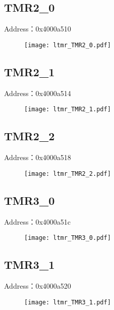 \subsection{TMR2\_0}
\label{ltmr-TMR2-0}
Address：0x4000a510
 \begin{figure}[H]
\texttt{[image: ltmr\_TMR2\_0.pdf]}
\end{figure}

\subsection{TMR2\_1}
\label{ltmr-TMR2-1}
Address：0x4000a514
 \begin{figure}[H]
\texttt{[image: ltmr\_TMR2\_1.pdf]}
\end{figure}

\subsection{TMR2\_2}
\label{ltmr-TMR2-2}
Address：0x4000a518
 \begin{figure}[H]
\texttt{[image: ltmr\_TMR2\_2.pdf]}
\end{figure}

\subsection{TMR3\_0}
\label{ltmr-TMR3-0}
Address：0x4000a51c
 \begin{figure}[H]
\texttt{[image: ltmr\_TMR3\_0.pdf]}
\end{figure}

\subsection{TMR3\_1}
\label{ltmr-TMR3-1}
Address：0x4000a520
 \begin{figure}[H]
\texttt{[image: ltmr\_TMR3\_1.pdf]}
\end{figure}

